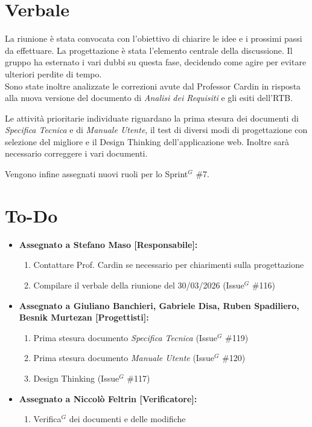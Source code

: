 \documentclass[a4paper,10pt]{article}
\begin{document}
\section*{Verbale}

La riunione è stata convocata con l’obiettivo di chiarire le idee e i prossimi passi da effettuare. La progettazione è stata l'elemento centrale della discussione. Il gruppo ha esternato i vari dubbi su questa fase, decidendo come agire per evitare ulteriori perdite di tempo. \\
Sono state inoltre analizzate le correzioni avute dal Professor Cardin in risposta alla nuova versione del documento di \textit{Analisi dei Requisiti} e gli esiti dell'RTB.

Le attività prioritarie individuate riguardano la prima stesura dei documenti di \textit{Specifica Tecnica} e di \textit{Manuale Utente}, il test di diversi modi di progettazione con selezione del migliore e il Design Thinking dell'applicazione web. Inoltre sarà necessario correggere i vari documenti.

Vengono infine assegnati nuovi ruoli per lo Sprint$^G$ \#7.

\section*{To-Do}
\begin{itemize}
\item \textbf{Assegnato a Stefano Maso [Responsabile]:}
    \begin{enumerate}
    \item Contattare Prof. Cardin se necessario per chiarimenti sulla progettazione
    \item Compilare il verbale della riunione del 30/03/2026 (Issue$^G$ \#116)
    \end{enumerate}
\item \textbf{Assegnato a Giuliano Banchieri, Gabriele Disa, Ruben Spadiliero, Besnik Murtezan [Progettisti]:}
    \begin{enumerate}
    \item Prima stesura documento \textit{Specifica Tecnica} (Issue$^G$ \#119)
    \item Prima stesura documento \textit{Manuale Utente} (Issue$^G$ \#120)
    \item Design Thinking (Issue$^G$ \#117)
    \end{enumerate}
\item \textbf{Assegnato a Niccolò Feltrin [Verificatore]:}
    \begin{enumerate}
    \item Verifica$^G$ dei documenti e delle modifiche
    \end{enumerate}
\end{itemize}
\end{document}
